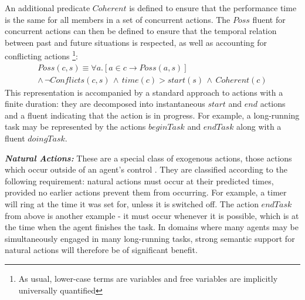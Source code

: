 An additional predicate $Coherent$ is defined to ensure that the
performance time is the same for all members in a set of concurrent
actions. The $Poss$ fluent for concurrent actions can then be defined
to ensure that the temporal relation between past and future situations
is respected, as well as accounting for conflicting actions%
\footnote{As usual, lower-case terms are variables and free variables are implicitly
universally quantified%
}:\begin{multline*}
Poss(c,s)\equiv\forall a.\left[a\in c\rightarrow Poss(a,s)\right]\\
\wedge\,\neg Conflicts(c,s)\,\wedge\, time(c)>start(s)\,\wedge\, Coherent(c)\end{multline*}
 This representation is accompanied by a standard approach to actions
with a finite duration: they are decomposed into instantaneous $start$
and $end$ actions and a fluent indicating that the action is in progress.
For example, a long-running task may be represented by the actions
$beginTask$ and $endTask$ along with a fluent $doingTask$.

\textbf{\emph{Natural Actions:}} These are a special class of exogenous
actions, those actions which occur outside of an agent's control \citet{reiter96sc_nat_conc}.
They are classified according to the following requirement: natural
actions must occur at their predicted times, provided no earlier actions
prevent them from occurring. For example, a timer will ring at the
time it was set for, unless it is switched off. The action $endTask$
from above is another example - it must occur whenever it is possible,
which is at the time when the agent finishes the task. In domains
where many agents may be simultaneously engaged in many long-running
tasks, strong semantic support for natural actions will therefore
be of significant benefit.

